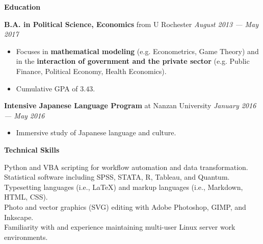 \documentclass[12pt]{article}
\newenvironment{details}{
\begin{itemize}[label={}]
	\small \setlength{\itemsep}{0pt}
}{\end{itemize}}
\begin{document}
\vspace{.2in}
\large
\textbf{Education} \hrulefill

\vspace{.1in}
\normalsize
\textbf{B.A. in Political Science, Economics} from U Rochester \hfill \textit{August 2013 --- May 2017}
\begin{details}
	\item Focuses in \textbf{mathematical modeling} (e.g. Econometrics, Game Theory) and in the \textbf{interaction of government and the private sector} (e.g. Public Finance, Political Economy, Health Economics).
	\item Cumulative GPA of $3.43$.
\end{details}

\vspace{.1in}
\normalsize
\textbf{Intensive Japanese Language Program} at Nanzan University \hfill \textit{January 2016 --- May 2016}
\begin{details}
	\item Immersive study of Japanese language and culture. \\
\end{details}

\vspace{.2in}
\large
\textbf{Technical Skills} \hrulefill

\normalsize
\onehalfspacing
\begin{flushleft}
	Python and VBA scripting for workflow automation and data transformation. \\
	Statistical software including SPSS, STATA, R, Tableau, and Quantum. \\
	Typesetting languages (i.e., \LaTeX) and markup languages (i.e., Markdown, HTML, CSS). \\
	Photo and vector graphics (SVG) editing with Adobe Photoshop, GIMP, and Inkscape. \\
	Familiarity with and experience maintaining multi-user Linux server work environments.
\end{flushleft}
\end{document}
